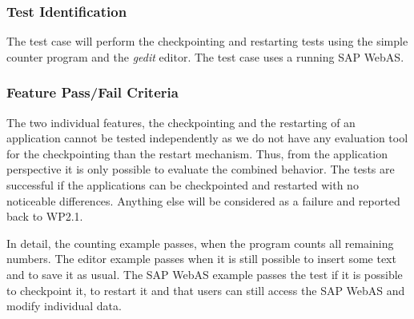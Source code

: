 \subsubsection{Test Identification}
The test case  will perform the checkpointing and restarting tests using the simple counter program and the \emph{gedit} editor. The test case  uses a running SAP WebAS.



\subsubsection{Feature Pass/Fail Criteria}
The two individual features, the checkpointing and the restarting of an application cannot be tested independently as we do not have any evaluation tool for the checkpointing than the restart mechanism. Thus, from the application perspective it is only possible to evaluate the combined behavior.
The tests are successful if the applications can be checkpointed and restarted with no noticeable differences. Anything else will be considered as a failure and reported back to WP2.1. 

In detail, the counting example passes, when the program counts all remaining numbers. The editor example passes when it is still possible to insert some text and to save it as usual. The SAP WebAS example passes the test if it is possible to checkpoint it, to restart it and that users can still access the SAP WebAS and modify individual data.
